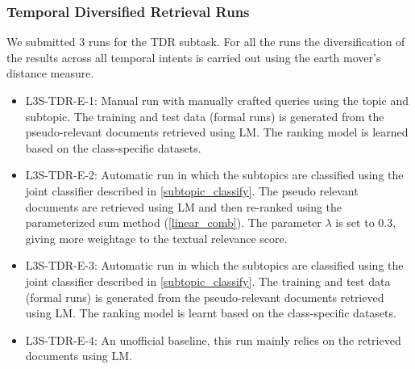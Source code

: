 \documentclass{sig-alternate}
\begin{document}
\subsubsection{Temporal Diversified Retrieval Runs}
We submitted 3 runs for the TDR subtask. For all the runs the diversification of the results across all temporal intents is carried out using the earth mover's distance measure.
\begin{itemize}
\item \textsf{L3S-TDR-E-1}: Manual run with manually crafted queries using the topic and subtopic. The training and test data (formal runs) is generated from the pseudo-relevant documents retrieved using LM. The ranking model is learned based on the class-specific datasets.
\item \textsf{L3S-TDR-E-2}: Automatic run in which the subtopics are classified using the joint classifier described in \ref{subtopic_classify}. The pseudo relevant documents are retrieved using LM and then re-ranked using the parameterized sum method (\ref{linear_comb}). The parameter $\lambda$ is set to 0.3, giving more weightage to the textual relevance score.
\item \textsf{L3S-TDR-E-3}: Automatic run in which the subtopics are classified using the joint classifier described in \ref{subtopic_classify}. The training and test data (formal runs) is generated from the pseudo-relevant documents retrieved using LM. The ranking model is learnt based on the class-specific datasets.
\item \textsf{L3S-TDR-E-4}: An unofficial baseline, this run mainly relies on the retrieved documents using LM.
\end{itemize}
\end{document}
